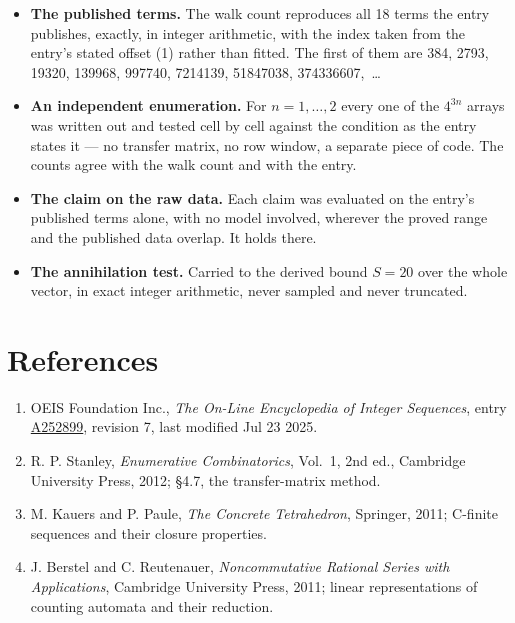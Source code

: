 \documentclass[11pt]{article}
\theoremstyle{definition}
\begin{document}
\begin{itemize}

\item {\bfseries The published terms.} The walk count reproduces all 18 terms the entry publishes, exactly, in integer arithmetic, with the index taken from the entry's stated offset (1) rather than fitted. The first of them are 384, 2793, 19320, 139968, 997740, 7214139, 51847038, 374336607,~\dots

\item {\bfseries An independent enumeration.} For $n = 1,\dots,2$ every one of the $4^{3n}$ arrays was written out and tested cell by cell against the condition as the entry states it --- no transfer matrix, no row window, a separate piece of code. The counts agree with the walk count and with the entry.

\item {\bfseries The claim on the raw data.} Each claim was evaluated on the entry's published terms alone, with no model involved, wherever the proved range and the published data overlap. It holds there.

\item {\bfseries The annihilation test.} Carried to the derived bound $S = 20$ over the whole vector, in exact integer arithmetic, never sampled and never truncated.

\end{itemize}

\section{References}

\begin{enumerate}

\item OEIS Foundation Inc., \emph{The On-Line Encyclopedia of Integer Sequences}, entry \href{https://oeis.org/A252899}{A252899}, revision 7, last modified Jul 23 2025.

\item R. P. Stanley, \emph{Enumerative Combinatorics}, Vol.~1, 2nd ed., Cambridge University Press, 2012; \S4.7, the transfer-matrix method.

\item M. Kauers and P. Paule, \emph{The Concrete Tetrahedron}, Springer, 2011; C-finite sequences and their closure properties.

\item J. Berstel and C. Reutenauer, \emph{Noncommutative Rational Series with Applications}, Cambridge University Press, 2011; linear representations of counting automata and their reduction.

\end{enumerate}
\end{document}
